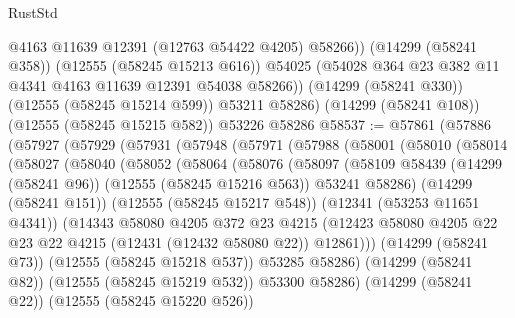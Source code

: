 \begin{lexlean}{RustStd}
\begin{coremodule}
            @4163
            @11639
            @12391
            (@12763 @54422 @4205)
            @58266))
        (@14299 (@58241 @358))
        (@12555 (@58245 @15213 @616))
        @54025
        (@54028 @364 @23 @382 @11 @4341 @4163 @11639 @12391 @54038 @58266))
      (@14299 (@58241 @330))
      (@12555 (@58245 @15214 @599))
      @53211
      @58286)
    (@14299 (@58241 @108))
    (@12555 (@58245 @15215 @582))
    @53226
    @58286
@58537 := @57861
    (@57886
      (@57927
        (@57929
          (@57931
            (@57948
              (@57971
                (@57988
                  (@58001
                    (@58010
                      (@58014
                        (@58027
                          (@58040
                            (@58052
                              (@58064
                                (@58076
                                  (@58097
                                    (@58109
                                      @58439
                                      (@14299 (@58241 @96))
                                      (@12555 (@58245 @15216 @563))
                                      @53241
                                      @58286)
                                    (@14299 (@58241 @151))
                                    (@12555 (@58245 @15217 @548))
                                    (@12341 (@53253 @11651 @4341))
                                    (@14343
                                      @58080
                                      @4205
                                      @372
                                      @23
                                      @4215
                                      (@12423
                                        @58080
                                        @4205
                                        @22
                                        @23
                                        @22
                                        @4215
                                        (@12431 (@12432 @58080 @22))
                                        @12861)))
                                  (@14299 (@58241 @73))
                                  (@12555 (@58245 @15218 @537))
                                  @53285
                                  @58286)
                                (@14299 (@58241 @82))
                                (@12555 (@58245 @15219 @532))
                                @53300
                                @58286)
                              (@14299 (@58241 @22))
                              (@12555 (@58245 @15220 @526))

\end{coremodule}
\end{lexlean}
